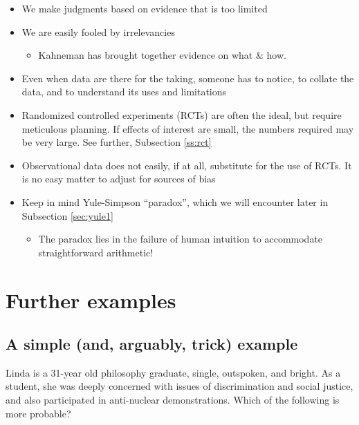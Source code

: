 \documentclass[
  10pt,
  b5paper]{book}
\providecommand{\tightlist}{%
  \setlength{\itemsep}{0pt}\setlength{\parskip}{0pt}}
\begin{document}
\begin{itemize}
\tightlist
\item
  We make judgments based on evidence that is too limited
\item
  We are easily fooled by irrelevancies

  \begin{itemize}
  \tightlist
  \item
    Kahneman has brought together evidence on what \& how.
  \end{itemize}
\item
  Even when data are there for the taking, someone has
  to notice, to collate the data, and to understand its uses
  and limitations
\item
  Randomized controlled experiments (RCTs) are often the ideal, but
  require meticulous planning. If effects of interest are small,
  the numbers required may be very large. See further,
  Subsection \ref{ss:rct}
\item
  Observational data does not easily, if at all, substitute for
  the use of RCTs. It is no easy matter to adjust for sources
  of bias
\item
  Keep in mind Yule-Simpson ``paradox'', which we will encounter
  later in Subsection \ref{sec:yule1}

  \begin{itemize}
  \tightlist
  \item
    The paradox lies in the failure of human intuition to
    accommodate straightforward arithmetic!
  \end{itemize}
\end{itemize}

\hypertarget{further-examples}{%
\section{Further examples}\label{further-examples}}

\hypertarget{a-simple-and-arguably-trick-example}{%
\subsection*{A simple (and, arguably, trick) example}\label{a-simple-and-arguably-trick-example}}

Linda is a 31-year old philosophy graduate, single,
outspoken, and bright. As a student, she was deeply
concerned with issues of discrimination and social
justice, and also participated in anti-nuclear
demonstrations. Which of the following is more probable?
\end{document}
